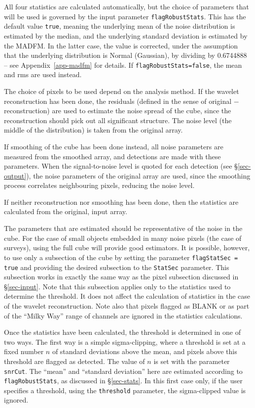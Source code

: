 All four statistics are calculated automatically, but the choice of
parameters that will be used is governed by the input parameter
\texttt{flagRobustStats}. This has the default value \texttt{true},
meaning the underlying mean of the noise distribution is estimated by
the median, and the underlying standard deviation is estimated by the
MADFM. In the latter case, the value is corrected, under the
assumption that the underlying distribution is Normal (Gaussian), by
dividing by 0.6744888 -- see Appendix~\ref{app-madfm} for details. If
\texttt{flagRobustStats=false}, the mean and rms are used instead.

The choice of pixels to be used depend on the analysis method. If the
wavelet reconstruction has been done, the residuals (defined
in the sense of original $-$ reconstruction) are used to estimate the
noise spread of the cube, since the reconstruction should pick out
all significant structure. The noise level (the middle of the
distribution) is taken from the original array.

If smoothing of the cube has been done instead, all noise parameters
are measured from the smoothed array, and detections are made with
these parameters. When the signal-to-noise level is quoted for each
detection (see \S\ref{sec-output}), the noise parameters of the
original array are used, since the smoothing process correlates
neighbouring pixels, reducing the noise level.

If neither reconstruction nor smoothing has been done, then the
statistics are calculated from the original, input array. 

The parameters that are estimated should be representative of the
noise in the cube. For the case of small objects embedded in many
noise pixels (\eg the case of \hi surveys), using the full cube will
provide good estimators. It is possible, however, to use only a
subsection of the cube by setting the parameter \texttt{flagStatSec =
  true} and providing the desired subsection to the \texttt{StatSec}
parameter. This subsection works in exactly the same way as the pixel
subsection discussed in \S\ref{sec-input}. Note that this subsection
applies only to the statistics used to determine the threshold. It
does not affect the calculation of statistics in the case of the
wavelet reconstruction. Note also that pixels flagged as BLANK or as
part of the ``Milky Way'' range of channels are ignored in the
statistics calculations.


Once the statistics have been calculated, the threshold is determined
in one of two ways. The first way is a simple sigma-clipping, where a
threshold is set at a fixed number $n$ of standard deviations above
the mean, and pixels above this threshold are flagged as detected. The
value of $n$ is set with the parameter \texttt{snrCut}. The ``mean''
and ``standard deviation'' here are estimated according to
\texttt{flagRobustStats}, as discussed in \S\ref{sec-stats}. In this
first case only, if the user specifies a threshold, using the
\texttt{threshold} parameter, the sigma-clipped value is ignored.

